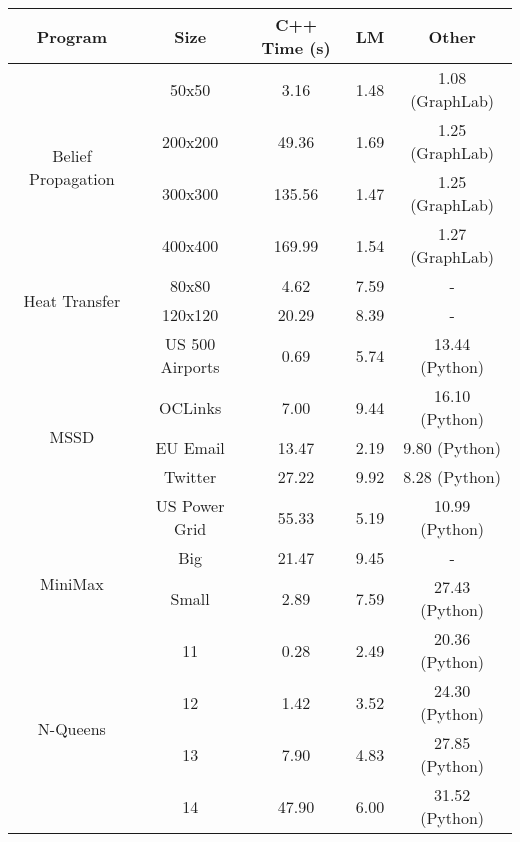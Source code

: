 \begin{tabular}{c | c || c | c | c} \hline
	\textbf{Program} & \textbf{Size} & \textbf{C++ Time} (s) & \textbf{LM} & \textbf{Other} \\ \hline \hline
	\multirow{4}{*}{Belief Propagation}  & 50x50 &  3.16  &  1.48  &  1.08 (GraphLab) \\
		 & 200x200 &  49.36  &  1.69  &  1.25 (GraphLab) \\
		 & 300x300 &  135.56  &  1.47  &  1.25 (GraphLab) \\
		 & 400x400 &  169.99  &  1.54  &  1.27 (GraphLab) \\
	\hline
	\multirow{2}{*}{Heat Transfer}  & 80x80 &  4.62  &  7.59  &  - \\
		 & 120x120 &  20.29  &  8.39  &  - \\
	\hline
	\multirow{5}{*}{MSSD}  & US 500 Airports &  0.69  &  5.74  &  13.44 (Python) \\
		 & OCLinks &  7.00  &  9.44  &  16.10 (Python) \\
		 & EU Email &  13.47  &  2.19  &  9.80 (Python) \\
		 & Twitter &  27.22  &  9.92  &  8.28 (Python) \\
		 & US Power Grid &  55.33  &  5.19  &  10.99 (Python) \\
	\hline
	\multirow{2}{*}{MiniMax}  & Big &  21.47  &  9.45  &  - \\
		 & Small &  2.89  &  7.59  &  27.43 (Python) \\
	\hline
	\multirow{4}{*}{N-Queens}  & 11 &  0.28  &  2.49  &  20.36 (Python) \\
		 & 12 &  1.42  &  3.52  &  24.30 (Python) \\
		 & 13 &  7.90  &  4.83  &  27.85 (Python) \\
		 & 14 &  47.90  &  6.00  &  31.52 (Python) \\
	\hline
\end{tabular}
